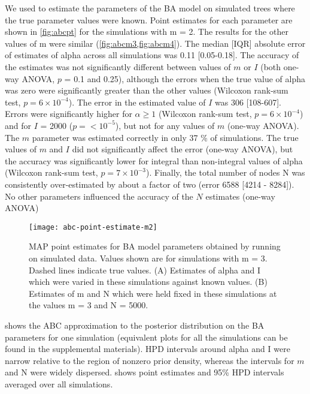 We used  to estimate the parameters of the \gls{BA} model on
simulated trees where the true parameter values were known. Point estimates for
each parameter are shown in \cref{fig:abcpt} for the simulations with \gls{m} =
2. The results for the other values of \gls{m} were similar
(\cref{fig:abcm3,fig:abcm4}). The median [IQR] absolute error of estimates of
\gls{alpha} across all simulations was
    0.11 
    [0.05-0.18].
The accuracy of the estimates was not significantly different between values of
$m$ or $I$ (both one-way ANOVA,
    $p$ = 0.1
and 
    0.25),
although the errors when the true value of \gls{alpha} was zero were
significantly greater than the other values 
    (Wilcoxon rank-sum test, $p = 6\!\times\!10^{-4}$).
The error in the estimated value of $I$ was
    306 
    [108-607].
Errors were significantly higher for $\alpha \geq 1$
    (Wilcoxon rank-sum test, $p = 6\!\times\!10^{-4}$)
and for $I$ = 2000
    ($p = {<}10^{-5}$),
but not for any values of $m$ (one-way ANOVA). The $m$ parameter was estimated
correctly in only
    37 \%
of simulations. The true values of $m$ and $I$ did not significantly affect the
error (one-way ANOVA), but the accuracy was significantly lower for integral
than non-integral values of \gls{alpha}
    (Wilcoxon rank-sum test, $p = 7\!\times\!10^{-3}$).
Finally, the total number of nodes \gls{N} was consistently over-estimated by
about a factor of two
    (error 6588 
    [4214 - 
     8284]).
No other parameters influenced the accuracy of the $N$ estimates (one-way
ANOVA)

\begin{figure}
  \texttt{[image: abc-point-estimate-m2]}
  \caption{
    \Acrlong{MAP} point estimates for \gls{BA} model parameters obtained by         
    running  on simulated data. Values shown are for               
    simulations with \gls{m} = 3. Dashed lines indicate true values. (A)            
    Estimates of \gls{alpha} and \gls{I} which were varied in these simulations  
    against known values. (B) Estimates of \gls{m} and \gls{N} which were held   
    fixed in these simulations at the values \gls{m} = 3 and \gls{N} = 5000. 
  }
  \label{fig:abcm2}
\end{figure}

 shows the \gls{ABC} approximation to the posterior
distribution on the \gls{BA} parameters for one simulation (equivalent plots
for all the simulations can be found in the supplemental materials). \Gls{HPD}
intervals around \gls{alpha} and \gls{I} were narrow relative to the region of
nonzero prior density, whereas the intervals for $m$ and \gls{N} were widely
dispersed.  shows point estimates and 95\% \gls{HPD}
intervals averaged over all simulations.

